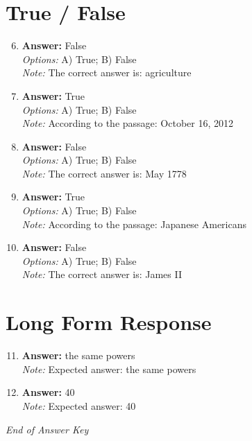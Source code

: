 \documentclass[12pt]{article}
\begin{document}
\section*{True / False}
\begin{enumerate}[label=\arabic*.]
\setcounter{enumi}{5}
\item \textbf{Answer:} False
\\ \textit{Options:} A) True; B) False
\\ \textit{Note:} The correct answer is: agriculture
\item \textbf{Answer:} True
\\ \textit{Options:} A) True; B) False
\\ \textit{Note:} According to the passage: October 16, 2012
\item \textbf{Answer:} False
\\ \textit{Options:} A) True; B) False
\\ \textit{Note:} The correct answer is: May 1778
\item \textbf{Answer:} True
\\ \textit{Options:} A) True; B) False
\\ \textit{Note:} According to the passage: Japanese Americans
\item \textbf{Answer:} False
\\ \textit{Options:} A) True; B) False
\\ \textit{Note:} The correct answer is: James II
\end{enumerate}

\section*{Long Form Response}
\begin{enumerate}[label=\arabic*.]
\setcounter{enumi}{10}
\item \textbf{Answer:} the same powers
\\ \textit{Note:} Expected answer: the same powers
\item \textbf{Answer:} 40
\\ \textit{Note:} Expected answer: 40
\end{enumerate}

\vfill
\noindent\textit{End of Answer Key}
\end{document}
